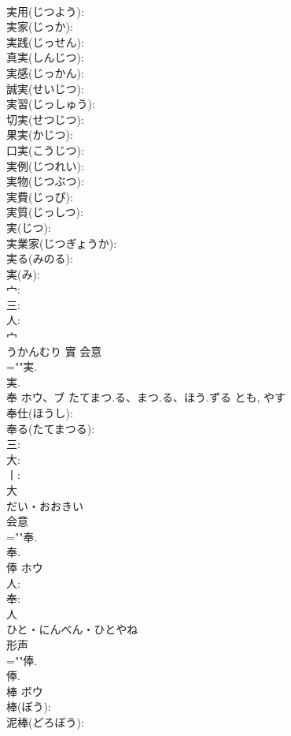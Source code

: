 \documentclass[8pt]{extreport}
\begin{document}
\begin{CJK}{UTF8}{min}
\\	実用(じつよう): 
\\	実家(じっか): 
\\	実践(じっせん): 
\\	真実(しんじつ): 
\\	実感(じっかん): 
\\	誠実(せいじつ): 
\\	実習(じっしゅう): 
\\	切実(せつじつ): 
\\	果実(かじつ): 
\\	口実(こうじつ): 
\\	実例(じつれい): 
\\	実物(じつぶつ): 
\\	実費(じっぴ): 
\\	実質(じっしつ): 
\\	実(じつ): 
\\	実業家(じつぎょうか): 
\\	実る(みのる): 
\\	実(み): 
\\	宀: 
\\	三: 
\\	人: 
\\	宀	
\\	うかんむり	實	会意 
\\	=""実.
\\	実.
\\	奉	ホウ、ブ	たてまつ.る、まつ.る、ほう.ずる	とも, やす	
\\	奉仕(ほうし): 
\\	奉る(たてまつる): 
\\	三: 
\\	大: 
\\	丨: 
\\	大	
\\	だい・おおきい	
\\	会意 
\\	=""奉.
\\	奉.
\\	俸	ホウ			
\\	人: 
\\	奉: 
\\	人	
\\	ひと・にんべん・ひとやね	
\\	形声 
\\	=""俸.
\\	俸.
\\	棒	ボウ			
\\	棒(ぼう): 
\\	泥棒(どろぼう): 

\end{CJK}
\end{document}
